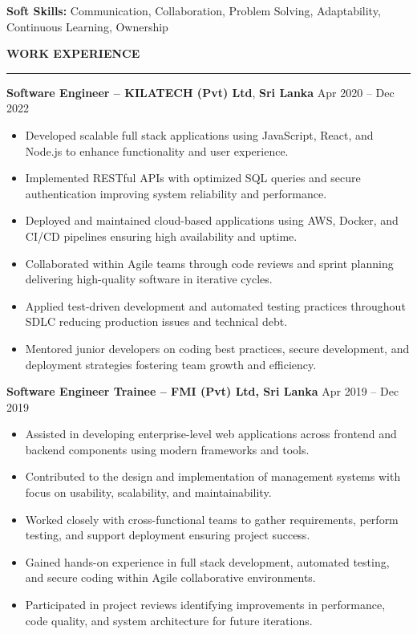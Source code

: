 \documentclass[10pt,letterpaper]{article}
\begin{document}
\textbf{Soft Skills:} Communication, Collaboration, Problem Solving, Adaptability, Continuous Learning, Ownership

\vspace{8pt}

\textbf{WORK EXPERIENCE}\\[-8pt]
\noindent\rule{\textwidth}{1pt}

\vspace{-2pt}

\textbf{Software Engineer -- KILATECH (Pvt) Ltd}, \textbf{Sri Lanka} \hfill Apr 2020 -- Dec 2022

\vspace{-1pt}

\begin{itemize}
\item Developed scalable full stack applications using JavaScript, React, and Node.js to enhance functionality and user experience.
\item Implemented RESTful APIs with optimized SQL queries and secure authentication improving system reliability and performance.
\item Deployed and maintained cloud-based applications using AWS, Docker, and CI/CD pipelines ensuring high availability and uptime.
\item Collaborated within Agile teams through code reviews and sprint planning delivering high-quality software in iterative cycles.
\item Applied test-driven development and automated testing practices throughout SDLC reducing production issues and technical debt.
\item Mentored junior developers on coding best practices, secure development, and deployment strategies fostering team growth and efficiency.
\end{itemize}

\textbf{Software Engineer Trainee -- FMI (Pvt) Ltd, Sri Lanka} \hfill Apr 2019 -- Dec 2019

\vspace{-1pt}

\begin{itemize}
\item Assisted in developing enterprise-level web applications across frontend and backend components using modern frameworks and tools.
\item Contributed to the design and implementation of management systems with focus on usability, scalability, and maintainability.
\item Worked closely with cross-functional teams to gather requirements, perform testing, and support deployment ensuring project success.
\item Gained hands-on experience in full stack development, automated testing, and secure coding within Agile collaborative environments.
\item Participated in project reviews identifying improvements in performance, code quality, and system architecture for future iterations.
\end{itemize}
\end{document}
